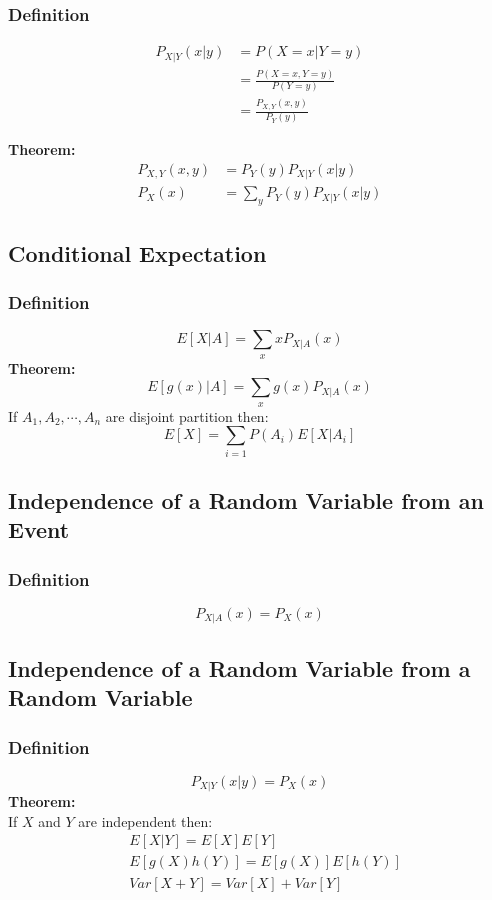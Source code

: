 \documentclass[11pt]{article}
\begin{document}
\subsubsection{Definition}
\begin{equation*}
    \begin{split}
        P_{X|Y}(x|y) & = P(X=x|Y=y)\\
        & = \frac{P(X=x, Y=y)}{P(Y=y)}\\
        & = \frac{P_{X,Y}(x,y)}{P_Y(y)}
    \end{split}
\end{equation*}

\noindent \textbf{Theorem:}\\
\begin{equation*}
    \begin{split}
        P_{X,Y}(x,y) & = P_Y(y)P_{X|Y}(x|y)\\
        P_{X}(x) & = \sum_y P_Y(y)P_{X|Y}(x|y)
    \end{split}
\end{equation*}

\subsection{Conditional Expectation}
\subsubsection{Definition}
$$E[X|A] = \sum_x xP_{X|A}(x)$$
\noindent \textbf{Theorem:}\\
$$E[g(x)|A] = \sum_x g(x)P_{X|A}(x)$$
\indent If $A_1, A_2, \cdots , A_n$ are disjoint partition then:\\
$$E[X] = \sum_{i=1} P(A_i) E[X|A_i]$$

\subsection{Independence of a Random Variable from an Event}
\subsubsection{Definition}
$$P_{X|A}(x) = P_X(x)$$

\subsection{Independence of a Random Variable from a Random Variable}
\subsubsection{Definition}
$$P_{X|Y}(x|y) = P_X(x)$$
\noindent \textbf{Theorem:}\\
\indent If $X$ and $Y$ are independent then:\\
\begin{equation*}
    \begin{split}
        & E[X|Y] = E[X]E[Y]\\
        & E[g(X)h(Y)] = E[g(X)]E[h(Y)]\\
        & Var[X+Y] = Var[X] + Var[Y]
    \end{split}
\end{equation*}
\end{document}
